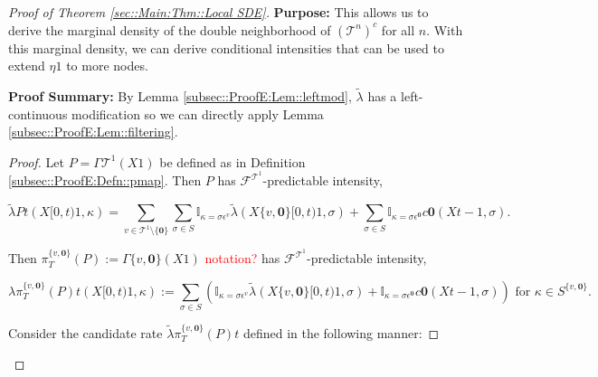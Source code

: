 \documentclass[12pt]{article}
\newcommand{\mb}{\mathbb}
\newcommand{\mc}{\mathcal}
\newcommand{\te}{\text}
\newcommand{\ep}{\epsilon}
\newcommand{\tr}{\textcolor{red}}
\newcommand{\purpose}{\textbf{Purpose: }}
\newcommand{\pfsum}{\textbf{Proof Summary: }}
\newcommand{\defeq}{:=}								%
\renewcommand{\root}{\mathbf{0}}				%
\renewcommand{\v}{v}							%
\renewcommand{\S}{S}							%
\newcommand{\s}{\sigma}							%
\newcommand{\ev}{\ep}							%
\newcommand{\T}{T}								%
\renewcommand{\t}{t}							%
\newcommand{\proj}{\pi}							%
\newcommand{\F}{\mc{F}}							%
\newcommand{\X}{X}								%
\newcommand{\IGr}{c}							%
\newcommand{\vind}[1]{^{#1}}					%
\newcommand{\carp}[1]{^{#1}}					%
\newcommand{\vsi}[1]{^{#1}}						%
\newcommand{\ts}[1]{_{#1}}						%
\newcommand{\tree}{\mc{T}}						%
\newcommand{\sln}[1]{^{#1}}						%
\newcommand{\rate}{\lambda}						%
\newcommand{\alt}[1]{\widetilde{#1}}			%
\newcommand{\mmm}{\eta}							%
\newcommand{\pmap}{\Gamma}						%
\renewcommand{\mark}{\kappa}					%
\newcommand{\rp}{P}								%
\newcommand{\crate}{\alt{\lambda}}				%
\begin{document}
\begin{proof}[Proof of Theorem \ref{sec::Main:Thm::Local SDE}]
\purpose This allows us to derive the marginal density of the double neighborhood of \((\tree\sln{n})^c\) for all \(n\). With this marginal density, we can derive conditional intensities that can be used to extend \(\mmm{}{}{1}\) to more nodes.

\pfsum By Lemma \ref{subsec::ProofE:Lem::leftmod}, \(\crate{}{}\) has a left-continuous modification so we can directly apply Lemma \ref{subsec::ProofE:Lem::filtering}.

\begin{proof}
Let \(\rp{} = \pmap{\tree\sln{1}}(\X{}{}{1})\) be defined as in Definition \ref{subsec::ProofE:Defn::pmap}. Then \(\rp{}\) has \(\F\vsi{\tree\sln{1}}\ts{}\)-predictable intensity,

\[\crate{\rp{}}{\t}(\X{}{[0,\t)}{1},\mark{}) = \sum_{\v\in \tree\sln{1}\setminus\{\root\}}\sum_{\s\in \S} \mb{I}_{\mark{} = \s\ev\vind{\v}}\crate{}{}(\X{\{\v,\root\}}{[0,\t)}{1},\s) + \sum_{\s\in\S}\mb{I}_{\mark{} = \s\ev\vind{\root}}\IGr{\root}(\X{}{\t-}{1},\s).\]

Then \(\proj\vsi{\{\v,\root\}}\ts{\T}(\rp{})\defeq \pmap{\{\v,\root\}}(\X{}{}{1})\) \tr{notation?} has \(\F\vsi{\tree\sln{1}}\ts{}\)-predictable intensity,

\[\rate{\proj\vsi{\{\v,\root\}}\ts{\T}(\rp{})}{\t}(\X{}{[0,\t)}{1},\mark{}) \defeq \sum_{\s\in \S} \left(\mb{I}_{\mark{} = \s\ev\vind{\v}}\crate{}{}(\X{\{\v,\root\}}{[0,\t)}{1},\s) + \mb{I}_{\mark{} = \s\ev\vind{\root}}\IGr{\root}(\X{}{\t-}{1},\s)\right)\te{ for } \kappa \in \S\carp{\{\v,\root\}}.\]

Consider the candidate rate \(\crate{\proj\vsi{\{\v,\root\}}\ts{\T}(\rp{})}{\t}\) defined in the following manner:


\end{proof}
\end{proof}
\end{document}

